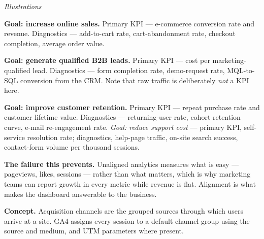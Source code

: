 \begin{qlist}
\textit{Illustrations}
\begin{apts}\setcounter{enumi}{7}
\item \textbf{Goal: increase online sales.} Primary KPI --- e-commerce
      conversion rate and revenue. Diagnostics --- add-to-cart rate,
      cart-abandonment rate, checkout completion, average order value.
\item \textbf{Goal: generate qualified B2B leads.} Primary KPI --- cost per
      marketing-qualified lead. Diagnostics --- form completion rate,
      demo-request rate, MQL-to-SQL conversion from the CRM. Note that raw
      traffic is deliberately \emph{not} a KPI here.
\item \textbf{Goal: improve customer retention.} Primary KPI --- repeat purchase
      rate and customer lifetime value. Diagnostics --- returning-user rate,
      cohort retention curve, e-mail re-engagement rate. \emph{Goal: reduce
      support cost} --- primary KPI, self-service resolution rate; diagnostics,
      help-page traffic, on-site search success, contact-form volume per
      thousand sessions.
\end{apts}

\textbf{The failure this prevents.} Unaligned analytics measures what is easy
--- pageviews, likes, sessions --- rather than what matters, which is why
marketing teams can report growth in every metric while revenue is flat.
Alignment is what makes the dashboard answerable to the business.

\textbf{Concept.} Acquisition channels are the grouped sources through which
users arrive at a site. GA4 assigns every session to a default channel group
using the source and medium, and UTM parameters where present.


\end{qlist}

